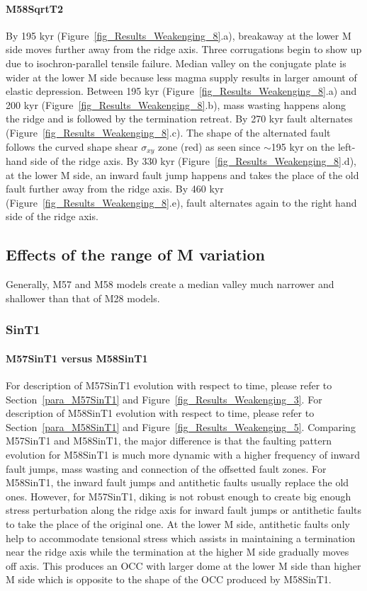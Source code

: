 \documentclass[draft,gc]{agutex}
\begin{document}
\begin{article}
\paragraph{M58SqrtT2}\label{para_M58SqrtT2}
By 195 kyr (Figure~\ref{fig_Results_Weakenging_8}.a), breakaway at the lower M side moves further away from the ridge axis. Three corrugations begin to show up due to isochron-parallel tensile failure. Median valley on the conjugate plate is wider at the lower M side because less magma supply results in larger amount of elastic depression. Between 195 kyr (Figure~\ref{fig_Results_Weakenging_8}.a) and 200 kyr (Figure~\ref{fig_Results_Weakenging_8}.b), mass wasting happens along the ridge and is followed by the termination retreat. By 270 kyr fault alternates (Figure~\ref{fig_Results_Weakenging_8}.c). The shape of the alternated fault follows the curved shape shear $\sigma_{xy}$ zone (red) as seen since $\sim$195 kyr on the left-hand side of the ridge axis. By 330 kyr (Figure~\ref{fig_Results_Weakenging_8}.d), at the lower M side, an inward fault jump happens and takes the place of the old fault further away from the ridge axis. By 460 kyr (Figure~\ref{fig_Results_Weakenging_8}.e), fault alternates again to the right hand side of the ridge axis.

\subsection{Effects of the range of M variation}
Generally, M57 and M58 models create a median valley much narrower and shallower than that of M28 models.
\subsubsection{SinT1}
\paragraph{M57SinT1 versus M58SinT1}\label{M57SinT1 versus M58SinT1}
For description of M57SinT1 evolution with respect to time, please refer to Section~\ref{para_M57SinT1} and Figure~\ref{fig_Results_Weakenging_3}. For description of M58SinT1 evolution with respect to time, please refer to  Section~\ref{para_M58SinT1} and Figure~\ref{fig_Results_Weakenging_5}. Comparing M57SinT1 and M58SinT1, the major difference is that the faulting pattern evolution for M58SinT1 is much more dynamic with a higher frequency of inward fault jumps, mass wasting and connection of the offsetted fault zones. For M58SinT1, the inward fault jumps and antithetic faults usually replace the old ones. However, for M57SinT1, diking is not robust enough to create big enough stress perturbation along the ridge axis for inward fault jumps or antithetic faults to take the place of the original one. At the lower M side, antithetic faults only help to accommodate tensional stress which assists in maintaining a termination near the ridge axis while the termination at the higher M side gradually moves off axis. This produces an OCC with larger dome at the lower M side than higher M side which is opposite to the shape of the OCC produced by M58SinT1.


\end{article}
\end{document}
